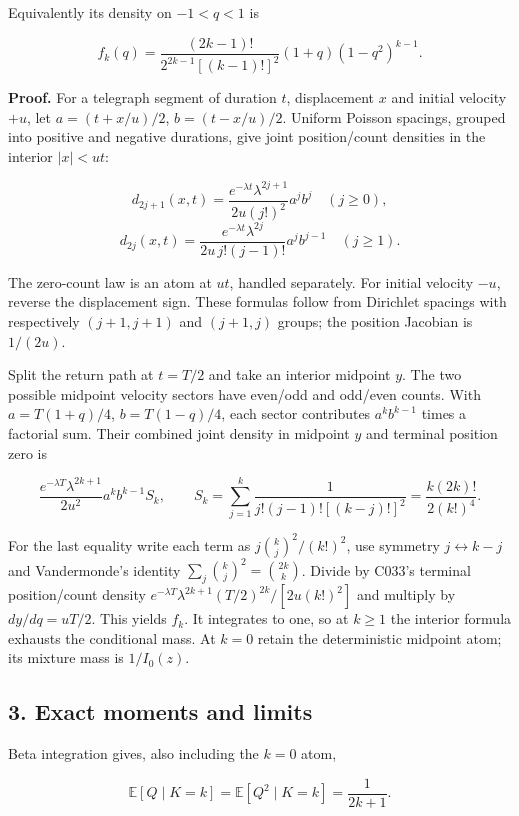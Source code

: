 \documentclass[11pt,a4paper]{article}
\begin{document}
Equivalently its density on \(-1<q<1\) is

\[f_k(q)=\frac{(2k-1)!}{2^{2k-1}[(k-1)!]^2}
                  (1+q)(1-q^2)^{k-1}.\]

\textbf{Proof.} For a telegraph segment of duration \(t\), displacement
\(x\) and initial velocity \(+u\), let \(a=(t+x/u)/2\), \(b=(t-x/u)/2\).
Uniform Poisson spacings, grouped into positive and negative durations,
give joint position/count densities in the interior \(|x|<ut\):

\[d_{2j+1}(x,t)=\frac{e^{-\lambda t}\lambda^{2j+1}}{2u(j!)^2}a^jb^j
\quad(j\ge0),\]
\[d_{2j}(x,t)=\frac{e^{-\lambda t}\lambda^{2j}}{2u\,j!(j-1)!}a^jb^{j-1}
\quad(j\ge1).\]

The zero-count law is an atom at \(ut\), handled separately. For initial
velocity \(-u\), reverse the displacement sign. These formulas follow
from Dirichlet spacings with respectively \((j+1,j+1)\) and \((j+1,j)\)
groups; the position Jacobian is \(1/(2u)\).

Split the return path at \(t=T/2\) and take an interior midpoint \(y\).
The two possible midpoint velocity sectors have even/odd and odd/even
counts. With \(a=T(1+q)/4\), \(b=T(1-q)/4\), each sector contributes
\(a^kb^{k-1}\) times a factorial sum. Their combined joint density in
midpoint \(y\) and terminal position zero is

\[\frac{e^{-\lambda T}\lambda^{2k+1}}{2u^2}a^kb^{k-1}S_k,
\qquad S_k=\sum_{j=1}^k\frac1{j!(j-1)![(k-j)!]^2}
             =\frac{k(2k)!}{2(k!)^4}.\]

For the last equality write each term as \(j\binom{k}{j}^2/(k!)^2\), use
symmetry \(j\leftrightarrow k-j\) and Vandermonde's identity
\(\sum_j\binom{k}{j}^2=\binom{2k}{k}\). Divide by C033's terminal
position/count density
\(e^{-\lambda T}\lambda^{2k+1}(T/2)^{2k}/[2u(k!)^2]\) and multiply by
\(dy/dq=uT/2\). This yields \(f_k\). It integrates to one, so at
\(k\ge1\) the interior formula exhausts the conditional mass. At \(k=0\)
retain the deterministic midpoint atom; its mixture mass is
\(1/I_0(z)\).

\hypertarget{exact-moments-and-limits}{%
\subsection{3. Exact moments and
limits}\label{exact-moments-and-limits}}

Beta integration gives, also including the \(k=0\) atom,

\[\mathbb E[Q\mid K=k]=\mathbb E[Q^2\mid K=k]=\frac1{2k+1}.\]
\end{document}
